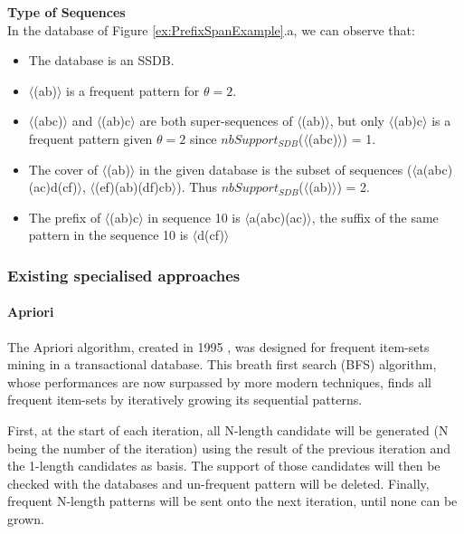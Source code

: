 \documentclass{eplmastersthesis}
\begin{document}
\begin{example}{\bfseries Type of Sequences}\\
In the database of Figure \ref{ex:PrefixSpanExample}.a, we can observe that:
\begin{itemize}
\item The database is an SSDB.
\item $\langle$(ab)$\rangle$ is a frequent pattern for $\theta = 2$.
\item $\langle$(abc)$\rangle$ and $\langle$(ab)c$\rangle$ are both super-sequences of $\langle$(ab)$\rangle$, but only $\langle$(ab)c$\rangle$ is a frequent pattern given $\theta = 2$ since $nbSupport_{SDB}$($\langle$(abc)$\rangle$) = 1.
\item The cover of $\langle$(ab)$\rangle$ in the given database is the subset of sequences ($\langle$a(abc)(ac)d(cf)$\rangle$, $\langle$(ef)(ab)(df)cb$\rangle$). Thus $nbSupport_{SDB}$($\langle$(ab)$\rangle$) = 2.
\item The prefix of $\langle$(ab)c$\rangle$ in sequence 10 is $\langle$a(abc)(ac)$\rangle$, the suffix of the same pattern in the sequence 10 is $\langle$d(cf)$\rangle$
\end{itemize}
\end{example}


\subsubsection{Existing specialised approaches}

\paragraph{Apriori}

The Apriori algorithm, created in 1995 \cite{agrawal1995mining}, was designed for frequent item-sets mining in a transactional database. This breath first search (BFS) algorithm, whose performances are now surpassed by more modern techniques, finds all frequent item-sets by iteratively growing its sequential patterns. \newline

First, at the start of each iteration, all N-length candidate will be generated (N being the number of the iteration) using the result of the previous iteration and the 1-length candidates as basis. The support of those candidates will then be checked with the databases and un-frequent pattern will be deleted. Finally, frequent N-length patterns will be sent onto the next iteration, until none can be grown. \newline
\end{document}

